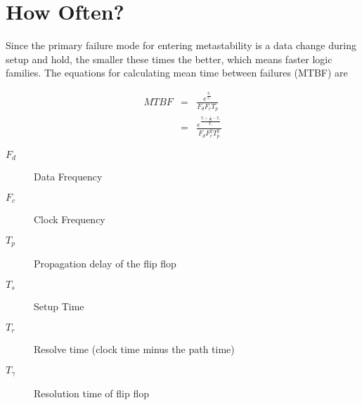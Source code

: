 \section{How Often?}

Since the primary failure mode for entering metastability is a data change during setup and hold, the smaller these times the better, which means faster logic families.  The equations for calculating mean time between failures (MTBF) are

\begin{eqnarray}
MTBF
&=& \frac{e^{\frac{T_r}{T_{\gamma}}}}{F_dF_cT_p}\\
&=& \frac{e^{\frac{T_r+\frac{1}{F_c}-T_s}{T_{\gamma}}}}{F_dF_c^2T_p^2}
\end{eqnarray}

\begin{description}
\item[$F_d$] Data Frequency
\item[$F_c$] Clock Frequency
\item[$T_p$] Propagation delay of the flip flop
\item[$T_s$] Setup Time
\item[$T_r$] Resolve time (clock time minus the path time)
\item[$T_{\gamma}$] Resolution time of flip flop
\end{description}
